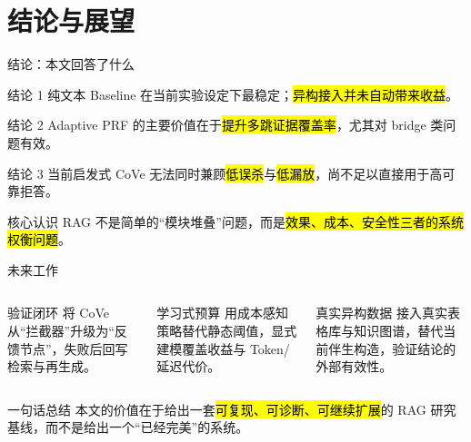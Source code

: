 \section{结论与展望}

\begin{frame}{结论：本文回答了什么}
  \begin{block}{结论 1}
    纯文本 Baseline 在当前实验设定下最稳定；\hl{异构接入并未自动带来收益}。
  \end{block}
  \begin{block}{结论 2}
    Adaptive PRF 的主要价值在于\hl{提升多跳证据覆盖率}，尤其对 bridge 类问题有效。
  \end{block}
  \begin{block}{结论 3}
    当前启发式 CoVe 无法同时兼顾\hl{低误杀}与\hl{低漏放}，尚不足以直接用于高可靠拒答。
  \end{block}
  \begin{alertblock}{核心认识}
    RAG 不是简单的“模块堆叠”问题，而是\hl{效果、成本、安全性三者的系统权衡问题}。
  \end{alertblock}
\end{frame}

\begin{frame}{未来工作}
  \begin{columns}[T,onlytextwidth]
    \begin{block}{验证闭环}
      将 CoVe 从“拦截器”升级为“反馈节点”，失败后回写检索与再生成。
    \end{block}

    \begin{block}{学习式预算}
      用成本感知策略替代静态阈值，显式建模覆盖收益与 Token/延迟代价。
    \end{block}

    \begin{block}{真实异构数据}
      接入真实表格库与知识图谱，替代当前伴生构造，验证结论的外部有效性。
    \end{block}
  \end{columns}

  \vspace{0.6em}
  \begin{exampleblock}{一句话总结}
    本文的价值在于给出一套\hl{可复现、可诊断、可继续扩展}的 RAG 研究基线，而不是给出一个“已经完美”的系统。
  \end{exampleblock}
\end{frame}
